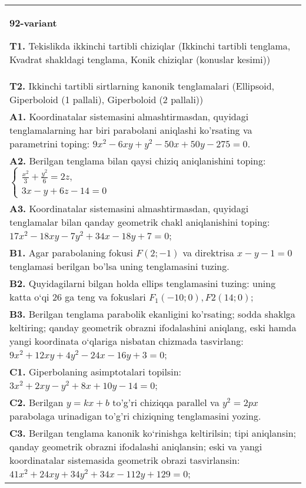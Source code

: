 \documentclass{article}
\begin{document}
\begin{tabular}{m{17cm}}
\textbf{92-variant}
\newline

\textbf{T1.} Tekislikda ikkinchi tartibli chiziqlar (Ikkinchi tartibli tenglama, Kvadrat shakldagi tenglama, Konik chiziqlar (konuslar kesimi)) \\
\textbf{T2.} Ikkinchi tartibli sirtlarning kanonik tenglamalari (Ellipsoid, Giperboloid (1 pallali), Giperboloid (2 pallali)) \\
\textbf{A1.} Koordinatalar sistemasini almashtirmasdan, quyidagi tenglamalarning har biri parabolani aniqlashi ko'rsating va parametrini toping: $9 x^2-6 x y+y^2-50 x+50 y-275=0$. \\
\textbf{A2.} Berilgan tenglama bilan qaysi chiziq aniqlanishini toping: $\left\{\begin{array}{l}\frac{x^2}{3}+\frac{y^2}{6}=2 z, \\ 3 x-y+6 z-14=0\end{array}\right.$ \\
\textbf{A3.} Koordinatalar sistemasini almashtirmasdan, quyidagi tenglamalar bilan qanday geometrik chakl aniqlanishini toping: $17 x^2-18 x y-7 y^2+34 x-18 y+7=0$; \\
\textbf{B1.} Agar parabolaning fokusi $F(2;-1) $ va direktrisa $x-y-1=0$ tenglamasi berilgan bo'lsa uning tenglamasini tuzing. \\
\textbf{B2.} Quyidagilarni bilgan holda ellips tenglamasini tuzing: uning katta o‘qi 26 ga teng va fokuslari $F_1 (-10; 0), F2 (14; 0) $; \\
\textbf{B3.} Berilgan tenglama parabolik ekanligini ko'rsating; sodda shaklga keltiring; qanday geometrik obrazni ifodalashini aniqlang, eski hamda yangi koordinata o‘qlariga nisbatan chizmada tasvirlang: $9 x^2+12 x y+4 y^2-24 x-16 y+3=0$; \\
\textbf{C1.} Giperbolaning asimptotalari topilsin: $3 x^2+2 x y-y^2+8 x+10 y-14=0$; \\
\textbf{C2.} Berilgan $y=k x+b$ to'g'ri chiziqqa parallel va $y^2=2 p x$ parabolaga urinadigan to'g'ri chiziqning tenglamasini yozing. \\
\textbf{C3.} Berilgan tenglama kanonik ko‘rinishga keltirilsin; tipi aniqlansin; qanday geometrik obrazni ifodalashi aniqlansin; eski va yangi koordinatalar sistemasida geometrik obrazi tasvirlansin: $41 x^2+24 x y+34 y^2+34 x-112 y+129=0$; \\

\end{tabular}
\vspace{1cm}
\end{document}
